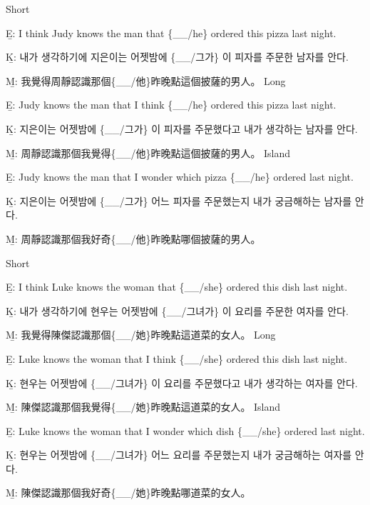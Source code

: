 \pex %
\a Short\par\nobreak
\beginsubsub
\b{E:} I think Judy knows the man that \{\_\_/he\} ordered this pizza last night.\par\nobreak
\b{K:} \ko 내가 생각하기에 지은이는 어젯밤에 \{\_\_/그가\} 이 피자를 주문한 남자를 안다. \normalfont\par\nobreak
\b{M:} \zh 我覺得周靜認識那個\{\_\_/他\}昨晚點這個披薩的男人。 \normalfont
\endsubsub
\a Long\par\nobreak
\beginsubsub
\b{E:} Judy knows the man that I think \{\_\_/he\} ordered this pizza last night.\par\nobreak
\b{K:} \ko 지은이는 어젯밤에 \{\_\_/그가\} 이 피자를 주문했다고 내가 생각하는 남자를 안다. \normalfont\par\nobreak
\b{M:} \zh 周靜認識那個我覺得\{\_\_/他\}昨晚點這個披薩的男人。 \normalfont
\endsubsub
\a Island\par\nobreak
\beginsubsub
\b{E:} Judy knows the man that I wonder which pizza \{\_\_/he\} ordered last night.\par\nobreak
\b{K:} \ko 지은이는 어젯밤에 \{\_\_/그가\} 어느 피자를 주문했는지 내가 궁금해하는 남자를 안다\normalfont.\par\nobreak
\b{M:} \zh 周靜認識那個我好奇\{\_\_/他\}昨晚點哪個披薩的男人。\normalfont
\endsubsub
\xe

\pex %
\a Short\par\nobreak
\beginsubsub
\b{E:} I think Luke knows the woman that \{\_\_/she\} ordered this dish last night.\par\nobreak
\b{K:} \ko 내가 생각하기에 현우는 어젯밤에 \{\_\_/그녀가\} 이 요리를 주문한 여자를 안다. \normalfont\par\nobreak
\b{M:} \zh 我覺得陳傑認識那個\{\_\_/她\}昨晚點這道菜的女人。 \normalfont
\endsubsub
\a Long\par\nobreak
\beginsubsub
\b{E:} Luke knows the woman that I think \{\_\_/she\} ordered this dish last night.\par\nobreak
\b{K:} \ko 현우는 어젯밤에 \{\_\_/그녀가\} 이 요리를 주문했다고 내가 생각하는 여자를 안다. \normalfont\par\nobreak
\b{M:} \zh 陳傑認識那個我覺得\{\_\_/她\}昨晚點這道菜的女人。 \normalfont
\endsubsub
\a Island\par\nobreak
\beginsubsub
\b{E:} Luke knows the woman that I wonder which dish \{\_\_/she\} ordered last night.\par\nobreak
\b{K:} \ko 현우는 어젯밤에 \{\_\_/그녀가\} 어느 요리를 주문했는지 내가 궁금해하는 여자를 안다\normalfont.\par\nobreak
\b{M:} \zh 陳傑認識那個我好奇\{\_\_/她\}昨晚點哪道菜的女人。\normalfont
\endsubsub
\xe

